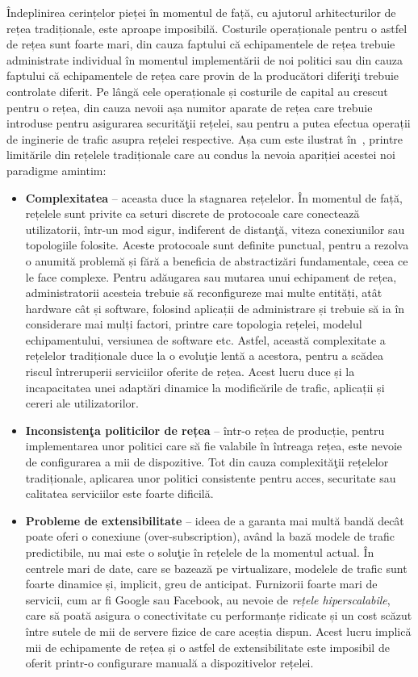 Îndeplinirea cerințelor pieței în momentul de față, cu ajutorul arhitecturilor de rețea tradiționale, este aproape imposibilă. Costurile operaționale pentru o astfel de rețea sunt foarte mari, din cauza faptului că echipamentele de rețea trebuie administrate individual în momentul implementării de noi politici sau din cauza faptului că echipamentele de rețea care provin de la producători diferiţi trebuie controlate diferit. Pe lângă cele operaționale și costurile de capital au crescut pentru o rețea, din cauza nevoii așa numitor aparate de rețea care trebuie introduse pentru asigurarea securităţii rețelei, sau pentru a putea efectua operații de inginerie de trafic asupra rețelei respective. Așa cum este ilustrat în~\cite{ome2012software}, printre limitările din rețelele tradiționale care au condus la nevoia apariției acestei noi paradigme amintim:
\begin{itemize}
	\item \textbf{Complexitatea} – aceasta duce la stagnarea rețelelor. În momentul de față, rețelele sunt privite ca seturi discrete de protocoale care conectează utilizatorii, într-un mod sigur, indiferent de distanţă, viteza conexiunilor sau topologiile folosite. Aceste protocoale sunt definite punctual, pentru a rezolva o anumită problemă și fără a beneficia de abstractizări fundamentale, ceea ce le face complexe. Pentru adăugarea sau mutarea unui echipament de rețea, administratorii acesteia trebuie să reconfigureze mai multe entități, atât hardware cât și software, folosind aplicații de administrare și trebuie să ia în considerare mai mulți factori, printre care topologia rețelei, modelul echipamentului, versiunea de software etc. Astfel, această complexitate a rețelelor tradiționale duce la o evoluţie lentă a acestora, pentru a scădea riscul întreruperii serviciilor oferite de rețea. Acest lucru duce și la incapacitatea unei adaptări dinamice la modificările de trafic, aplicații și cereri ale utilizatorilor.
	\item \textbf{Inconsistenţa politicilor de rețea} – într-o rețea de producție, pentru implementarea unor politici care să fie valabile în întreaga rețea, este nevoie de configurarea a mii de dispozitive. Tot din cauza complexităţii rețelelor tradiționale, aplicarea unor politici consistente pentru acces, securitate sau calitatea serviciilor este foarte dificilă.
	\item \textbf{Probleme de extensibilitate} – ideea de a garanta mai multă bandă decât poate oferi o conexiune (over-subscription), având la bază modele de trafic predictibile, nu mai este o soluţie în rețelele de la momentul actual. În centrele mari de date, care se bazează pe virtualizare, modelele de trafic sunt foarte dinamice și, implicit, greu de anticipat. Furnizorii foarte mari de servicii, cum ar fi Google sau Facebook, au nevoie de \textit{rețele hiperscalabile}, care să poată asigura o conectivitate cu performanțe ridicate și un cost scăzut între sutele de mii de servere fizice de care aceștia dispun. Acest lucru implică mii de echipamente de rețea și o astfel de extensibilitate este imposibil de oferit printr-o configurare manuală a dispozitivelor rețelei. 

\end{itemize}
